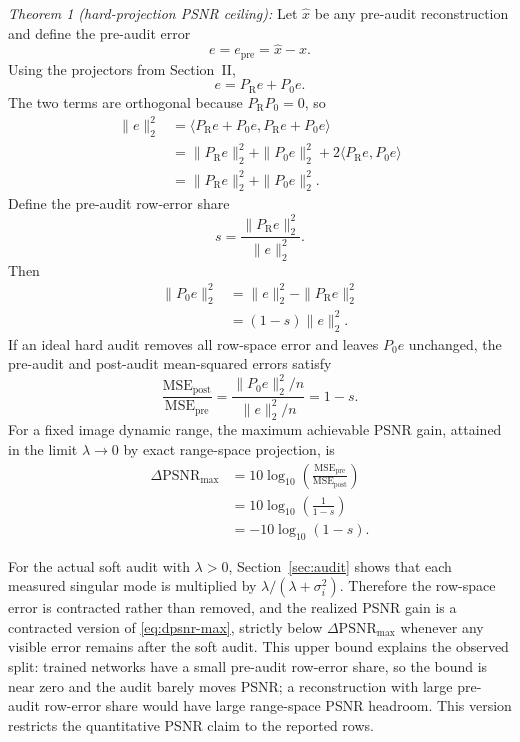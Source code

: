 \documentclass[journal]{IEEEtran}
\newcommand{\PR}{P_{\mathrm{R}}}
\newcommand{\PZ}{P_{0}}
\begin{document}
\textit{Theorem 1 (hard-projection PSNR ceiling):} Let $\hat{x}$ be any
pre-audit reconstruction and define the pre-audit error
\begin{equation}
    e=e_{\mathrm{pre}}=\hat{x}-x.
\end{equation}
Using the projectors from Section~II,
\begin{equation}
    e=\PR e+\PZ e.
\end{equation}
The two terms are orthogonal because $\PR\PZ=0$, so
\begin{align}
    \|e\|_2^2
    &= \langle \PR e+\PZ e,\PR e+\PZ e\rangle\\
    &= \|\PR e\|_2^2+\|\PZ e\|_2^2
       +2\langle \PR e,\PZ e\rangle\\
    &= \|\PR e\|_2^2+\|\PZ e\|_2^2.
    \label{eq:error-pythagoras}
\end{align}
Define the pre-audit row-error share
\begin{equation}
    s=\frac{\|\PR e\|_2^2}{\|e\|_2^2}.
    \label{eq:s-error-share}
\end{equation}
Then
\begin{align}
    \|\PZ e\|_2^2
    &= \|e\|_2^2-\|\PR e\|_2^2\\
    &= (1-s)\|e\|_2^2.
    \label{eq:null-error-share}
\end{align}
If an ideal hard audit removes all row-space error and leaves $\PZ e$ unchanged, the pre-audit and post-audit mean-squared errors satisfy
\begin{equation}
    \frac{\mathrm{MSE}_{\mathrm{post}}}{\mathrm{MSE}_{\mathrm{pre}}}
    =
    \frac{\|\PZ e\|_2^2/n}{\|e\|_2^2/n}
    =1-s.
    \label{eq:mse-ratio}
\end{equation}
For a fixed image dynamic range, the maximum achievable PSNR gain, attained in
the limit $\lambda\to0$ by exact range-space projection, is
\begin{align}
    \Delta\mathrm{PSNR}_{\max}
    &= 10\log_{10}\left(
       \frac{\mathrm{MSE}_{\mathrm{pre}}}{\mathrm{MSE}_{\mathrm{post}}}
       \right)\\
    &=10\log_{10}\left(\frac{1}{1-s}\right)\\
    &=-10\log_{10}(1-s).
    \label{eq:dpsnr-max}
\end{align}

For the actual soft audit with $\lambda>0$, Section~\ref{sec:audit} shows that
each measured singular mode is multiplied by $\lambda/(\lambda+\sigma_i^2)$.
Therefore the row-space error is contracted rather than removed, and the realized
PSNR gain is a contracted version of \eqref{eq:dpsnr-max}, strictly below
$\Delta\mathrm{PSNR}_{\max}$ whenever any visible error remains after the soft
audit.  This upper bound explains the observed split: trained networks have a
small pre-audit row-error share, so the bound is near zero and the audit barely
moves PSNR; a reconstruction with large pre-audit row-error share would have
large range-space PSNR headroom.  This version restricts the quantitative PSNR
claim to the reported rows.
\end{document}
